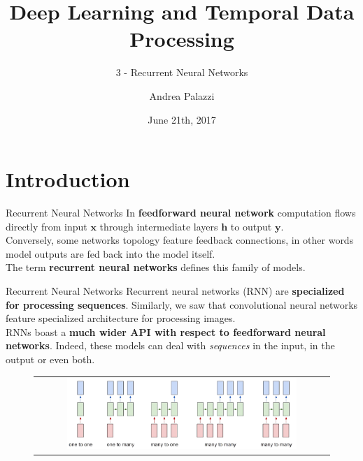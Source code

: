 \documentclass[aspectratio=169]{beamer}
\title[Deep Learning and Temporal Data Processing]{Deep Learning and Temporal Data Processing}
\subtitle{3 - Recurrent Neural Networks}
\institute{University of Modena and Reggio Emilia}
\author{Andrea Palazzi}
\date{June 21th, 2017}
\def\thisframelogos{}
\newcommand{\framelogo}[1]{\def\thisframelogos{#1}}
\begin{document}
\framelogo{logo_unimore_white.png}





\section{Introduction}


\begin{frame}{Recurrent Neural Networks}
In \textbf{feedforward neural network} computation flows directly from input $\bm{x}$ through intermediate layers $\bm{h}$ to output $\bm{y}$.\\
\vspace{0.5cm}
Conversely, some networks topology feature feedback connections, in other words model outputs are fed back into the model itself.\\
\vspace{0.5cm}
The term \textbf{recurrent neural networks} defines this family of models.

\end{frame}


\begin{frame}{Recurrent Neural Networks}
Recurrent neural networks (RNN) are \textbf{specialized for processing sequences}. Similarly, we saw that convolutional neural networks feature specialized architecture for processing images.\\
\vspace{0.4cm}
RNNs boast a \textbf{much wider API with respect to feedforward neural networks}. Indeed, these models can deal with \textit{sequences} in the input, in the output or even both.
\begin{figure}
\begin{tabular}{c}
\includegraphics[width=0.8\textwidth]{img/rnn/rnn_api.png}
\end{tabular}
\end{figure}
\end{frame}
\end{document}
